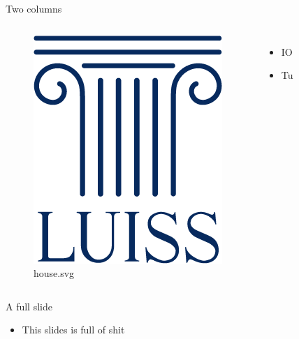 \documentclass[ignorenonframetext,]{beamer}
\providecommand{\tightlist}{%
  \setlength{\itemsep}{0pt}\setlength{\parskip}{0pt}}
\begin{document}
\begin{frame}{Two columns}

\begin{columns}


\begin{figure}[htbp]
\centering
\includegraphics{pics/luisslogo.png}
\caption{house.svg}
\end{figure}


\begin{itemize}
\tightlist
\item
  IO
\item
  Tu
\end{itemize}

\end{columns}

\end{frame}

\begin{frame}[plain]{}

\end{frame}

\begin{frame}{A full slide}

\begin{itemize}
\tightlist
\item
  This slides is full of shit
\end{itemize}

\end{frame}
\end{document}
